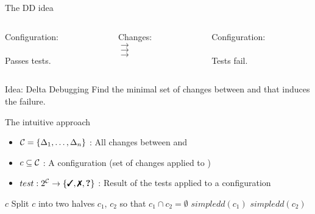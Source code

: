 \begin{frame}{The DD idea}
	\begin{columns}
		\begin{column}{0.4\textwidth}
			\begin{center}
			Configuration:\\[2em]

			\yd\\[1em]
			Passes tests. \green{\checkmark}
			\end{center}
		\end{column}
		\begin{column}{0.2\textwidth}
			\begin{center}
			Changes:\\[1.5em]
			$\longrightarrow$ \\
			$\longrightarrow$ \\
			$\longrightarrow$ \\
			\end{center}
			
		\end{column}
		\begin{column}{0.4\textwidth}
			\begin{center}	
			Configuration:\\[2em]

			\td\\[1em]
			Tests fail. 
			\end{center}
		\end{column}
	\end{columns}

	\bigskip

	\begin{exampleblock}{Idea: Delta Debugging}
		Find the minimal set of changes between \yd and \td that induces the failure.
	\end{exampleblock}
\end{frame}

\begin{frame}{The intuitive approach}
	\begin{itemize}
		\item $\mathcal{C} = \left\{ \Delta_1, \dots, \Delta_n \right\}$ : All changes between \yd and \td
		\item $c \subseteq \mathcal{C}$ : A configuration (set of changes applied to \yd)
		\item $test: 2^{\C} \to \set{\cmark,\xmark,\qmark}$ : Result of the tests applied to a configuration
	\end{itemize}
	
	\medskip

	\begin{algorithmic}[1]
			 \Return $c$ \EndIf
			\State Split $c$ into two halves $c_1$, $c_2$ so that $c_1 \cap c_2 = \emptyset$
			 \Return $simpledd(c_1)$ \Else{} \Return $simpledd(c_2)$
			\EndIf
		\EndFunction
	\end{algorithmic}
\end{frame}

